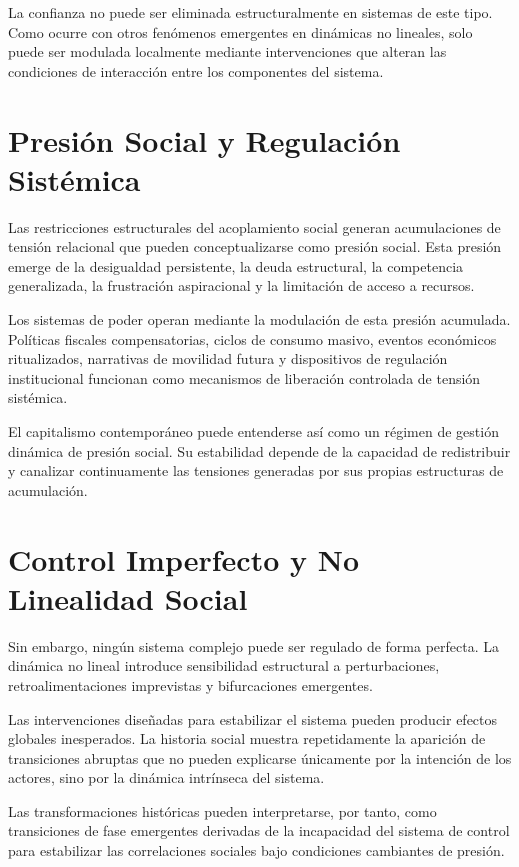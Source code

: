\documentclass[12pt,a4paper]{article}
\begin{document}
La confianza no puede ser eliminada estructuralmente en sistemas de este tipo.
Como ocurre con otros fenómenos emergentes en dinámicas no lineales, solo puede
ser modulada localmente mediante intervenciones que alteran las condiciones
de interacción entre los componentes del sistema.

\section{Presión Social y Regulación Sistémica}

Las restricciones estructurales del acoplamiento social generan acumulaciones
de tensión relacional que pueden conceptualizarse como presión social. Esta
presión emerge de la desigualdad persistente, la deuda estructural, la competencia
generalizada, la frustración aspiracional y la limitación de acceso a recursos.

Los sistemas de poder operan mediante la modulación de esta presión acumulada.
Políticas fiscales compensatorias, ciclos de consumo masivo, eventos económicos
ritualizados, narrativas de movilidad futura y dispositivos de regulación institucional
funcionan como mecanismos de liberación controlada de tensión sistémica.

El capitalismo contemporáneo puede entenderse así como un régimen de gestión
dinámica de presión social. Su estabilidad depende de la capacidad de redistribuir
y canalizar continuamente las tensiones generadas por sus propias estructuras
de acumulación.

\section{Control Imperfecto y No Linealidad Social}

Sin embargo, ningún sistema complejo puede ser regulado de forma perfecta.
La dinámica no lineal introduce sensibilidad estructural a perturbaciones,
retroalimentaciones imprevistas y bifurcaciones emergentes.

Las intervenciones diseñadas para estabilizar el sistema pueden producir efectos
globales inesperados. La historia social muestra repetidamente la aparición de
transiciones abruptas que no pueden explicarse únicamente por la intención de
los actores, sino por la dinámica intrínseca del sistema.

Las transformaciones históricas pueden interpretarse, por tanto, como transiciones
de fase emergentes derivadas de la incapacidad del sistema de control para estabilizar
las correlaciones sociales bajo condiciones cambiantes de presión.
\end{document}
